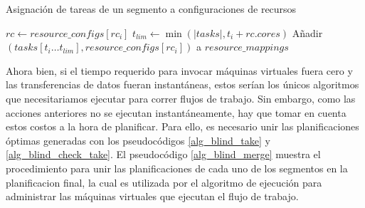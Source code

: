 \begin{algorithm}
\caption{Asignación de tareas de un segmento a configuraciones de recursos}
\label{alg_blind_check_take}
\begin{algorithmic}[1]
			\State $rc \gets resource\_configs[rc_i]$
			\State $t_{lim} \gets \min(|tasks|, t_i + rc.cores)$
			\State Añadir $(tasks[t_i \dots t_{lim}], resource\_configs[rc_i])$ a $resource\_mappings$
			\State {}
			\State {}	
		\EndIf
	\EndIf
\EndProcedure
\end{algorithmic}
\end{algorithm}

Ahora bien, si el tiempo requerido para invocar máquinas virtuales fuera cero y las transferencias de datos fueran instantáneas, estos serían los únicos algoritmos que necesitariamos ejecutar para correr flujos de trabajo. Sin embargo, como las acciones anteriores no se ejecutan instantáneamente, hay que tomar en cuenta estos costos a la hora de planificar. Para ello, es necesario unir las planificaciones \'optimas generadas con los pseudoc\'odigos \ref{alg_blind_take} y \ref{alg_blind_check_take}. El pseudoc\'odigo \ref{alg_blind_merge} muestra el procedimiento para unir las planificaciones de cada uno de los segmentos en la planificacion final, la cual es utilizada por el algoritmo de ejecuci\'on para administrar las m\'aquinas virtuales que ejecutan el flujo de trabajo.


